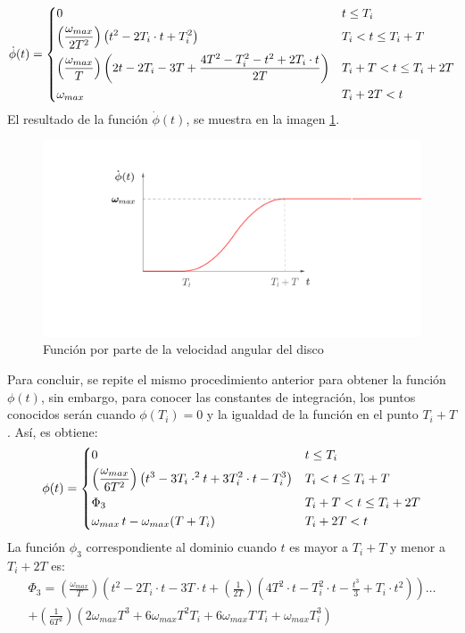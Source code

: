 \[ \dot{\phi}(t) =
\begin{dcases}
	0																												&	t \leq T_i \\
	\left(\frac{\omega_{max}}{2T^2}\right)\left(t^2 - 2T_i\cdot t + T_i^2\right)									&	T_i < t \leq T_i + T\\
	\left(\frac{\omega_{max}}{T}\right)\left(2t - 2T_i - 3T + \frac{4T^2 - T_i^2 - t^2 + 2T_i\cdot t}{2T}\right)	&	T_i + T < t \leq T_i + 2T\\
	\omega_{max}																									&	T_i + 2T < t\\
\end{dcases} 
\]
El resultado de la función $\dot{\phi}(t)$, se muestra en la imagen \ref{fig:anglep}.
\begin{figure}[h]
\centering
\includegraphics[width=0.7\linewidth, trim={8cm 5cm 12cm 3cm},clip]{Imagenes/anglep_function.pdf}
\caption{Función por parte de la velocidad angular del disco}
\label{fig:anglep}
\end{figure}

Para concluir, se repite el mismo procedimiento anterior para obtener la función $\phi (t)$, sin embargo, para conocer las constantes de integración, los puntos conocidos serán cuando $\phi(T_i) = 0$ y la igualdad de la función en el punto $T_i + T$. Así, es obtiene:
\[ \phi (t) =
\begin{dcases}
	0																									&	t \leq T_i \\
	\left(\frac{\omega_{max}}{6T^2}\right)\left(t^3 - 3T_i\cdot^2 t + 3T_i^2\cdot t - T_i^3\right)		&	T_i < t \leq T_i + T\\
	\Phi_3																								&	T_i + T < t \leq T_i + 2T\\
	\omega_{max}\, t - \omega_{max}(T + T_i)															&	T_i + 2T < t\\
\end{dcases} 
\]
La función $\phi_3$ correspondiente al dominio cuando $t$ es mayor a $T_i + T$ y menor a $T_i  + 2T$ es:
\begin{multline*}
\Phi_3 = \left(\frac{\omega_{max}}{T}\right)\left(t^2 - 2T_i\cdot t - 3T\cdot t + \left(\frac{1}{2T}\right)\left(4T^2\cdot t - T_i^2\cdot t - \frac{t^3}{3} + T_i\cdot t^2\right)\right)\dots \\
 + \left(\frac{1}{6T^2}\right) \left(2\omega_{max}T^3 + 6\omega_{max}T^2T_i + 6\omega_{max}T\,T_i + \omega_{max}T_i^3\right)
\end{multline*}

